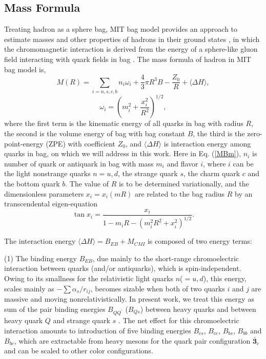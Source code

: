 \documentclass[prt,twocolumn,floatfix,nofootinbib]{revtex4}
\begin{document}
\subsection{Mass Formula}
Treating hadron as a sphere bag, MIT bag model provides an approach to estimate masses and other properties of hadrons in their ground states \cite{Johnson:1975zp,DeGrand:1975cf},
in which the chromomagnetic interaction is derived from the energy of a sphere-like gluon field interacting with quark fields in bag \cite{DeGrand:1975cf}.
The mass formula of hadron in MIT bag model is,
\begin{equation}\label{MBm}
    M\left(R\right)=\sum_{i=n,s,c,b} n_{i}\omega_{i}+\frac{4}{3}\pi R^{3}B-\frac{Z_{0}}{R}+\langle \Delta H \rangle,
\end{equation}
\begin{equation}\label{freq}
    \omega_{i}=\left(m_{i}^{2}+\frac{x_{i}^{2}}{R^2}\right)^{1/2},
\end{equation}
where the first term is the kinematic energy of all quarks in bag with radius $R$, the second is the volume energy of bag with bag constant $B$, the third is the zero-point-energy (ZPE) with coefficient $Z_{0}$, and $\langle \Delta H \rangle$ is interaction energy among quarks in bag, on which we will address in this work.
Here in Eq. (\ref{MBm}), $n_{i}$ is number of quark or antiquark in bag with mass $m_{i}$ and flavor $i$, where $i$ can be the light nonstrange quarks $n=u,d$, the strange quark $s$, the charm quark $c$ and the bottom quark $b$. The value of $R$ is to be determined variationally, and the dimensionless parameters $x_{i}=x_{i}(mR)$ are related to the bag radius $R$ by an transcendental eigen-equation
\begin{equation}\label{transc}
    \tan x_{i}=\frac{x_{i}}{1-m_{i}R-\left(m_{i}^{2}R^{2}+x_{i}^{2}\right)^{1/2}}.
\end{equation}

The interaction energy $\langle \Delta H \rangle=B_{EB}+ M_{CMI}$ is composed of two energy terms:

(1) The binding energy $B_{EB}$, due mainly to the short-range chromoelectric interaction between quarks (and/or antiquarks), which is spin-independent.
Owing to its smallness for the relativistic light quarks $n$($=u, d$), this energy, scales mainly as $-\sum \alpha_{s}/r_{ij}$, becomes sizable when both of two quarks $i$ and $j$ are massive and moving nonrelativistically.
In present work, we treat this energy as sum of the pair binding energies $B_{QQ^{\prime}}$ ($B_{Qs}$) between heavy quarks and between heavy quark $Q$ and strange quark $s$ \cite{Karliner:2014gca,Karliner:2017elp,Karliner:2018bms}.
The net effect for this chromoelectric interaction amounts to introduction of five binding energies $B_{cs}$, $B_{cc}$, $B_{bs}$, $B_{bb}$ and $B_{bc}$,
which are extractable from heavy mesons for the quark pair configuration $\boldsymbol{\bar{3}}_{c}$ and can be scaled to other color configurations.
\end{document}
